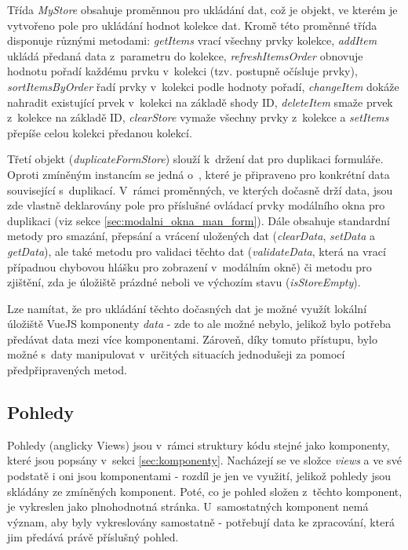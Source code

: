 		Třída \textit{MyStore} obsahuje proměnnou pro ukládání dat, což je objekt, ve kterém je vytvořeno pole pro ukládání hodnot kolekce dat. Kromě této proměnné třída disponuje různými metodami: \textit{getItems} vrací všechny prvky kolekce, \textit{addItem} ukládá předaná data z~parametru do kolekce, \textit{refreshItemsOrder} obnovuje hodnotu pořadí každému prvku v~kolekci (tzv. postupně očísluje prvky), \textit{sortItemsByOrder} řadí prvky v~kolekci podle hodnoty pořadí, \textit{changeItem} dokáže nahradit existující prvek v~kolekci na základě shody ID, \textit{deleteItem} smaže prvek z~kolekce na základě ID, \textit{clearStore} vymaže všechny prvky z~kolekce a \textit{setItems} přepíše celou kolekci předanou kolekcí.
		
		Třetí objekt (\textit{duplicateFormStore}) slouží k~držení dat pro duplikaci formuláře. Oproti zmíněným instancím se jedná o~, které je připraveno pro konkrétní data související s~duplikací. V~rámci proměnných, ve kterých dočasně drží data, jsou zde vlastně deklarovány pole pro příslušné ovládací prvky modálního okna pro duplikaci (viz sekce \ref{sec:modalni_okna_man_form}). Dále obsahuje standardní metody pro smazání, přepsání a vrácení uložených dat (\textit{clearData}, \textit{setData} a \textit{getData}), ale také metodu pro validaci těchto dat (\textit{validateData}, která na vrací případnou chybovou hlášku pro zobrazení v~modálním okně) či metodu pro zjištění, zda je úložiště prázdné neboli ve výchozím stavu (\textit{isStoreEmpty}).
		
		Lze namítat, že pro ukládání těchto dočasných dat je možné využít lokální úložiště VueJS komponenty \textit{data} - zde to ale možné nebylo, jelikož bylo potřeba předávat data mezi více komponentami. Zároveň, díky tomuto přístupu, bylo možné s~daty manipulovat v~určitých situacích jednodušeji za pomocí předpřipravených metod.
	
	\subsection{Pohledy}
	Pohledy (anglicky Views) jsou v~rámci struktury kódu stejné jako komponenty, které jsou popsány v~sekci \ref{sec:komponenty}. Nacházejí se ve složce \textit{views} a ve své podstatě i oni jsou komponentami - rozdíl je jen ve využití, jelikož pohledy jsou skládány ze zmíněných komponent. Poté, co je pohled složen z~těchto komponent, je vykreslen jako plnohodnotná stránka. U~samostatných komponent nemá význam, aby byly vykreslovány samostatně - potřebují data ke zpracování, která jim předává právě příslušný pohled. 
	

